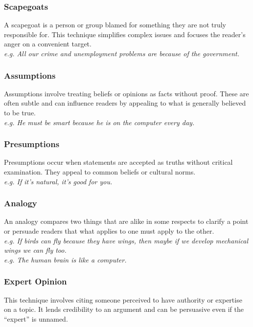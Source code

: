 \documentclass[a4paper]{article}
\begin{document}
\subsubsection{Scapegoats}
A scapegoat is a person or group blamed for something they are not truly responsible for. This technique simplifies complex issues and focuses the reader’s anger on a convenient target.\\

\textit{e.g. All our crime and unemployment problems are because of the government.}\\

\subsubsection{Assumptions}
Assumptions involve treating beliefs or opinions as facts without proof. These are often subtle and can influence readers by appealing to what is generally believed to be true.\\

\textit{e.g. He must be smart because he is on the computer every day.}\\

\subsubsection{Presumptions}
Presumptions occur when statements are accepted as truths without critical examination. They appeal to common beliefs or cultural norms.\\

\textit{e.g. If it’s natural, it’s good for you.}\\

\subsubsection{Analogy}
An analogy compares two things that are alike in some respects to clarify a point or persuade readers that what applies to one must apply to the other.\\

\textit{e.g. If birds can fly because they have wings, then maybe if we develop mechanical wings we can fly too.}\\
\textit{e.g. The human brain is like a computer.}\\

\subsubsection{Expert Opinion}
This technique involves citing someone perceived to have authority or expertise on a topic. It lends credibility to an argument and can be persuasive even if the “expert” is unnamed.\\
\end{document}
